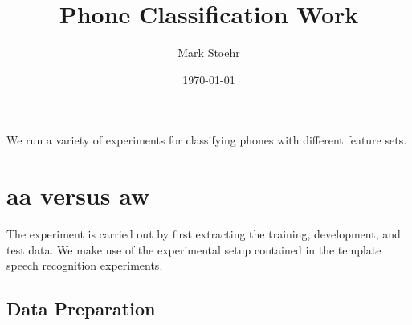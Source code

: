 \documentclass{article}
\title{Phone Classification Work}
\author{Mark Stoehr}
\date{\today}
\begin{document}
\maketitle

We run a variety of experiments for classifying phones with different feature sets.
\section{aa versus aw}

The experiment is carried out by first extracting the training, development, and test data.  We make use of the
experimental setup contained in the template speech recognition experiments.  

\subsection{Data Preparation}
\end{document}

